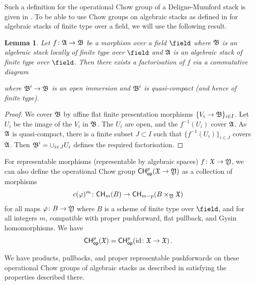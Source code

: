 \documentclass[a4paper,12pt]{article} %
\newcommand{\on}[1]{\operatorname{#1}}
\theoremstyle{definition}
\theoremstyle{plain}%
\newtheorem{lemma}[definition]{Lemma}
\renewcommand{\phi}{\varphi}
\newcommand{\Chow}{\mathsf{CH}}
\newcommand{\CHop}{\Chow_{\mathsf{op}}}
\begin{document}
Such a definition for the operational Chow group of a Deligne-Mumford stack is given in \cite{Edidin2017Towards-an-inter}. To be able to use Chow groups on algebraic stacks as defined in \cite{Kresch1999Cycle-groups-fo} for algebraic stacks of finite type over a field, we will use the following result. 
\begin{lemma}\label{lem:factorisationopenquasi}
Let $f\colon \frak A \to \frak B$ be a morphism over a field ${\field}$ where $\frak B$ is an algebraic stack 
locally of finite type over ${\field}$ and $\frak A$ is an algebraic stack of finite type over ${\field}$. Then there exists a factorisation of $f$ via a commutative diagram

\begin{center}
\end{center}
where $\frak B' \to \frak B$ is an open immersion and $\frak B'$ is quasi-compact (and hence of finite type).  
\end{lemma}

\begin{proof}
We cover $\frak B$ by affine flat finite presentation morphisms $\{V_i \to \frak B\}_{i \in I}$.  
Let $U_i$ be the image of the $V_i$ in $\frak B$. The $U_i$ are open, and the $f^{-1}(U_i)$ cover $\frak A$. As $\frak A$ is quasi-compact, there is a finite subset $J \subset I$ such that $\{f^{-1}(U_i)\}_{i \in J}$ covers $\frak A$. Then $\frak B' = \cup_{i \in J} U_i$ 
defines the required factorisation.
\end{proof}

For representable morphisms (representable by algebraic spaces) $f\colon \frak X \to \frak Y$, we can also define the operational Chow group $\CHop^p(\frak X \to \frak Y)$ as a collection of morphisms 
\[c(\phi)^{m}\colon \Chow_{m}(B) \to  \Chow_{m-p}(B \times_{\frak Y} \frak X)\]
for all maps $\phi \colon B \to \frak Y$ where $B$ is a scheme of finite type over ${\field}$, and for all integers $m$, compatible with proper pushforward, flat pullback, and Gysin homomorphisms. We have
$$\CHop^p(\frak X) = \CHop^p(\on{id}\colon \frak X \to \frak X)\,. $$

We have products, pullbacks, and proper representable pushforwards on these operational Chow groups of algebraic stacks as described in \cite[chapter 17.2]{Fulton1984Intersection-th} satisfying the properties described there.               
                              
\end{document}
